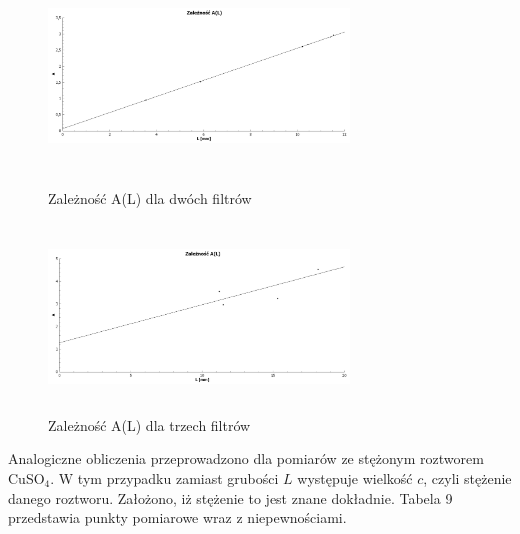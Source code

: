 \documentclass[10pt,a4paper]{article}
\begin{document}
\begin{figure}[h!]
\centering
\begin{minipage}{0.5\textwidth}
  \centering
  \includegraphics[width=8cm, height=5cm ]{rap72} 
\caption{Zależność A(L) dla dwóch filtrów}
\end{minipage}%
\begin{minipage}{0.5\textwidth}
  \centering
  \includegraphics[width=8cm, height=5cm ]{rap73} 
\caption{Zależność A(L) dla trzech filtrów}
\end{minipage}
\end{figure}
 
 
 Analogiczne obliczenia przeprowadzono dla pomiarów ze stężonym roztworem CuSO$_{4}$. W tym przypadku zamiast grubości $L$ występuje wielkość $c$, czyli stężenie danego roztworu. Założono, iż stężenie to jest znane dokładnie. Tabela 9 przedstawia punkty pomiarowe wraz z niepewnościami.
 
\end{document}
